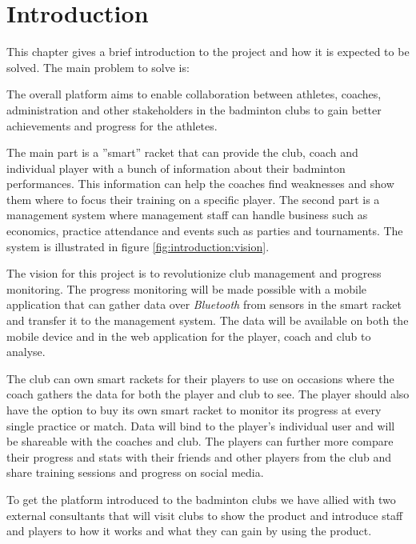 \chapter{Introduction}
This chapter gives a brief introduction to the project and how it is expected to be solved.
The main problem to solve is:


The overall platform aims to enable collaboration between athletes, coaches, administration and other stakeholders in the badminton clubs to gain better achievements and progress for the athletes.

The main part is a ''smart'' racket that can provide the club, coach and individual player with a bunch of information about their badminton performances.
This information can help the coaches find weaknesses and show them where to focus their training on a specific player.
The second part is a management system where management staff can handle business such as economics, practice attendance and events such as parties and tournaments.
The system is illustrated in figure \ref{fig:introduction:vision}.


The vision for this project is to revolutionize club management and progress monitoring.
The progress monitoring will be made possible with a mobile application that can gather data over \textit{Bluetooth} from sensors in the smart racket and transfer it to the management system.
The data will be available on both the mobile device and in the web application for the player, coach and club to analyse.

The club can own smart rackets for their players to use on occasions where the coach gathers the data for both the player and club to see.
The player should also have the option to buy its own smart racket to monitor its progress at every single practice or match.
Data will bind to the player's individual user and will be shareable with the coaches and club.
The players can further more compare their progress and stats with their friends and other players from the club and share training sessions and progress on social media.

To get the platform introduced to the badminton clubs we have allied with two external consultants that will visit clubs to show the product and introduce staff and players to how it works and what they can gain by using the product.

